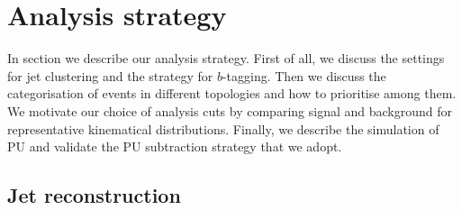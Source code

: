 
\section{Analysis strategy}
\label{sec:analysis}

In section we describe our analysis strategy.
%
First of all, we discuss the settings
for jet clustering  and the strategy for $b$-tagging.
%
Then we discuss the categorisation of events in different
topologies and how to prioritise among them.
%
We motivate our choice of analysis cuts by comparing signal and background
for representative kinematical distributions.
%
Finally, we describe the simulation of PU and validate
the PU subtraction strategy that we adopt.

\subsection{Jet reconstruction}

